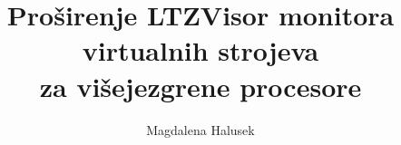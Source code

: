 \documentclass[times, utf8, diplomski, numeric]{fer}
\begin{document}
\renewcommand{\labelitemi}{$\bullet$}
\renewcommand{\labelitemii}{$-$}


\title{Proširenje LTZVisor monitora virtualnih strojeva \\za višejezgrene procesore}

\author{Magdalena Halusek}

\maketitle

\izvornik

\zahvala{}

\tableofcontents
\end{document}

